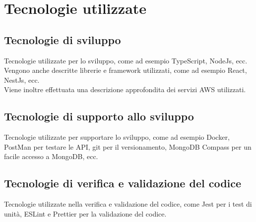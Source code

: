 \section{Tecnologie utilizzate}
\label{sez:tecnologie-utilizzate}

\subsection{Tecnologie di sviluppo}
\label{sez:tecnologie-sviluppo}

Tecnologie utilizzate per lo sviluppo, come ad esempio TypeScript, NodeJs, ecc.
Vengono anche descritte librerie e framework utilizzati, come ad esempio React, NestJs, ecc. \\
Viene inoltre effettuata una descrizione approfondita dei servizi AWS utilizzati.

\subsection{Tecnologie di supporto allo sviluppo}
\label{sez:tecnologie-supporto-sviluppo}

Tecnologie utilizzate per supportare lo sviluppo, come ad esempio Docker, PostMan per testare le API, git per il versionamento, MongoDB Compass per un facile accesso a MongoDB, ecc.

\subsection{Tecnologie di verifica e validazione del codice}
\label{sez:tecnologie-validazione-codice}

Tecnologie utilizzate nella verifica e validazione del codice, come Jest per i test di unità, ESLint e Prettier per la validazione del codice. 